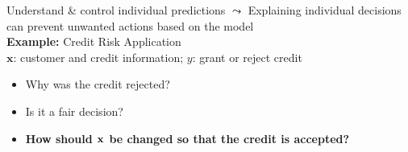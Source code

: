 \documentclass[11pt,compress,t,notes=noshow, aspectratio=169, xcolor=table]{beamer}
\begin{document}
\begin{frame}{Understand \& control individual predictions}
    $\leadsto$ Explaining individual decisions can prevent unwanted actions based on the model \\
    \medskip
    \textbf{Example:} Credit Risk Application\\
    $\textbf{x}$: customer and credit information; $y$: grant or reject credit
	
	\begin{itemize}
		\item Why was the credit rejected?
		\item Is it a fair decision?
		\item \textbf{How should $\xv$ be changed so that the credit is accepted?}
	\end{itemize}
	
\end{frame}

\end{document}
